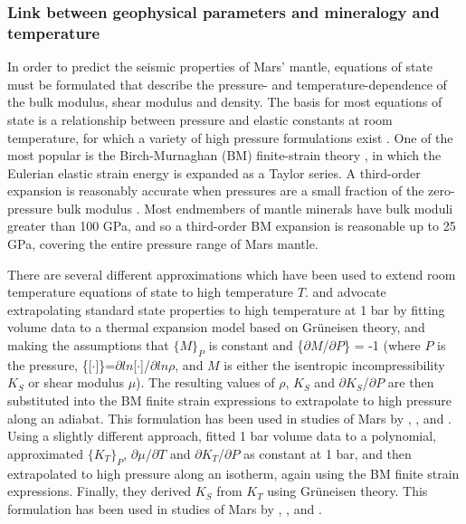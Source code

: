 \subsubsection{Link between geophysical parameters and mineralogy and temperature}
\label{sec:geo_min_link}

In order to predict the seismic properties of Mars' mantle, equations of state must be formulated that describe the pressure- and temperature-dependence of the bulk modulus, shear modulus and density. The basis for most equations of state is a relationship between pressure and elastic constants at room temperature, for which a variety of high pressure formulations exist \citep[e.g.][]{Stacey2004}. One of the most popular is the Birch-Murnaghan (BM) finite-strain theory \citep{Murnaghan1944,Birch1952}, in which the Eulerian elastic strain energy is expanded as a Taylor series. A third-order expansion is reasonably accurate when pressures are a small fraction of the zero-pressure bulk modulus \citep{Stixrude2005}. Most endmembers of mantle minerals have bulk moduli greater than 100 GPa, and so a third-order BM expansion is reasonable up to 25 GPa, covering the entire pressure range of Mars mantle.

There are several different approximations which have been used to extend room temperature equations of state to high temperature $T$. \cite{Anderson1988} and \cite{Duffy1989} advocate extrapolating standard state properties to high temperature at 1 bar by fitting volume data to a thermal expansion model based on Gr\"uneisen theory, and making the assumptions that $\{M\}_P$ is constant and \{$\partial$$M$/$\partial$$P$\} = -1 (where $P$ is the pressure, \{[$\cdot$]\}=$\partial$$ln$[$\cdot$]/$\partial$$ln$$\rho$, and $M$ is either the isentropic incompressibility $K_S$ or shear modulus $\mu$). The resulting values of $\rho$, $K_S$ and $\partial$$K_S$/$\partial$$P$ are then substituted into the BM finite strain expressions to extrapolate to high pressure along an adiabat. This formulation has been used in studies of Mars by \cite{Mocquet1996}, \cite{Verhoeven2005}, and \cite{Rivoldini2011}. Using a slightly different approach, \cite{Bina&Helffrich1992} fitted 1 bar volume data to a polynomial, approximated $\{K_T\}_P$, $\partial$$\mu$/$\partial$$T$ and $\partial$$K_T$/$\partial$$P$ as constant at 1 bar, and then extrapolated to high pressure along an isotherm, again using the BM finite strain expressions. Finally, they derived $K_S$ from $K_T$ using Gr\"uneisen theory. This formulation has been used in studies of Mars by \cite{Sohl1997}, \cite{Bertka1998}, and \cite{Zharkov2005}.


